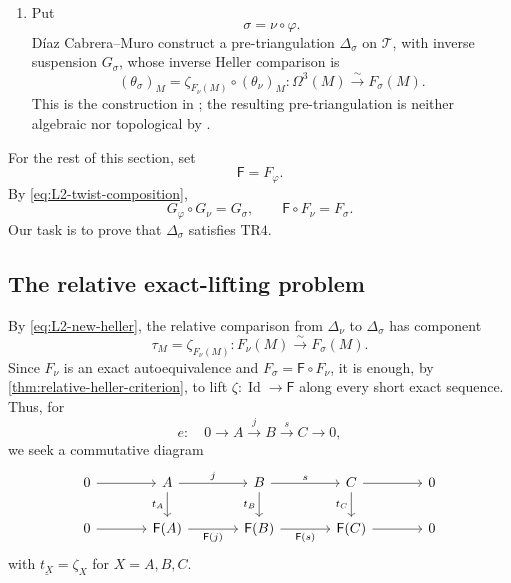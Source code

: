 \documentclass[a4paper,11pt,reqno]{amsart}
\theoremstyle{definition}
\theoremstyle{plain}
\numberwithin{equation}{section}
\newcommand{\T}{\mathcal T}
\begin{document}
\begin{enumerate}[label=\textup{(\roman*)},leftmargin=2.1em]
\item Put
\[
 \sigma=\nu\circ\varphi.
\]
D\'iaz Cabrera--Muro construct a pre-triangulation \(\Delta_\sigma\) on
\(\T\), with inverse suspension \(G_\sigma\), whose inverse Heller
comparison is
\begin{equation}
\label{eq:L2-new-heller}
 (\theta_\sigma)_M
 =\zeta_{F_\nu(M)}\circ(\theta_\nu)_M:
 \Omega^3(M)\xrightarrow{\sim}F_\sigma(M).
\end{equation}
This is the construction in
\cite[Theorem~2.6 and Corollary~3.8]{DiazCabreraMuro2026}; the resulting
pre-triangulation is neither algebraic nor topological by
\cite[Corollary~4.2]{DiazCabreraMuro2026}.
\end{enumerate}

For the rest of this section, set
\[
 \mathsf F=F_\varphi.
\]
By \eqref{eq:L2-twist-composition},
\begin{equation}
\label{eq:L2-composition-of-twists}
 G_\varphi\circ G_\nu=G_\sigma,
 \qquad
 \mathsf F\circ F_\nu=F_\sigma.
\end{equation}
Our task is to prove that \(\Delta_\sigma\) satisfies \(\mathrm{TR4}\).

\subsection{The relative exact-lifting problem}

By \eqref{eq:L2-new-heller}, the relative comparison from
\(\Delta_\nu\) to \(\Delta_\sigma\) has component
\begin{equation}
\label{eq:L2-relative-comparison}
 \tau_M=\zeta_{F_\nu(M)}:
 F_\nu(M)\xrightarrow{\sim}F_\sigma(M).
\end{equation}
Since \(F_\nu\) is an exact autoequivalence and
\(F_\sigma=\mathsf F\circ F_\nu\), it is enough, by
\cref{thm:relative-heller-criterion}, to lift
\(\zeta:\operatorname{Id}\to\mathsf F\) along every short exact sequence.
Thus, for
\[
 e:\quad
 0\longrightarrow A\xrightarrow{j}B\xrightarrow{s}C\longrightarrow0,
\]
we seek a commutative diagram
\begin{equation}
\label{eq:L2-zeta-lift}
\begin{tikzcd}[column sep=large]
0\arrow[r]&A\arrow[r,"j"]\arrow[d,"t_A"']&
B\arrow[r,"s"]\arrow[d,"t_B"']&
C\arrow[r]\arrow[d,"t_C"']&0\\
0\arrow[r]&\mathsf F(A)\arrow[r,"\mathsf F(j)"']&
\mathsf F(B)\arrow[r,"\mathsf F(s)"']&
\mathsf F(C)\arrow[r]&0
\end{tikzcd}
\end{equation}
with \(\underline{t_X}=\zeta_X\) for \(X=A,B,C\).
\end{document}
